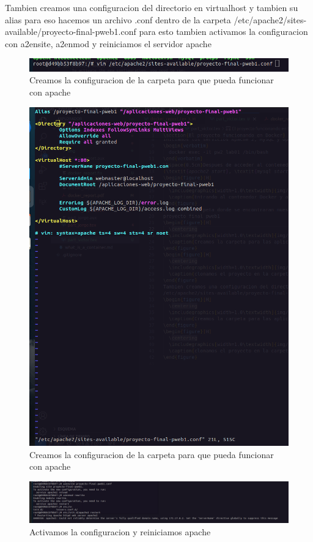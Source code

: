 Tambien creamos una configuracion del directorio en virtualhost y tambien su alias para eso hacemos un archivo .conf dentro de la carpeta 
/etc/apache2/sites-available/proyecto-final-pweb1.conf para esto tambien activamos la configuracion con a2ensite, a2enmod y reiniciamos el servidor apache
\begin{figure}[H]
  \centering
  \includegraphics[width=1.0\textwidth]{img/Creacion_conf.png}
  \caption{Creamos la configuracion de la carpeta para que pueda funcionar con apache}
\end{figure}
\begin{figure}[H]
  \centering
  \includegraphics[width=1.0\textwidth]{img/Configuracion.png}
  \caption{Creamos la configuracion de la carpeta para que pueda funcionar con apache}
\end{figure}
\begin{figure}[H]
  \centering
  \includegraphics[width=1.0\textwidth]{img/Activacion_configuracion.png}
  \caption{Activamos la configuracion y reiniciamos apache}
\end{figure}
